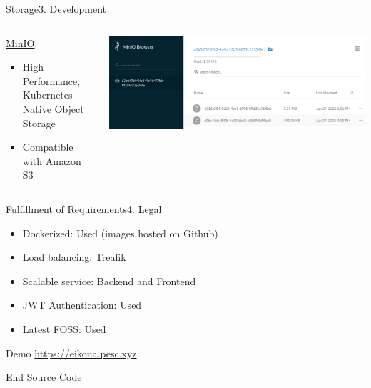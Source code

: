 \documentclass[aspectratio=169,20pt]{beamer}
\begin{document}
\begin{frame}{Storage}{3. Development}
	\begin{columns}[onlytextwidth,T]
		\begin{column}{.40\linewidth}
			\underline{MinIO}:
			\vspace{1in}
			\begin{itemize}
				\item{High Performance, Kubernetes Native Object Storage}
				\item{Compatible with Amazon S3}
			\end{itemize}
		\end{column}
		\begin{column}{.60\linewidth}
			\includegraphics[scale=0.45]{minio}
		\end{column}
	\end{columns}
\end{frame}

\begin{frame}{Fulfillment of Requirements}{4. Legal}
	\begin{itemize}
		\item{Dockerized: \textcolor{deepgreen}{Used (images hosted on Github)}}
		\item{Load balancing: \textcolor{deepgreen}{Treafik}}
		\item{Scalable service: \textcolor{deepgreen}{Backend and Frontend}}
		\item{JWT Authentication: \textcolor{deepgreen}{Used}}
		\item{Latest FOSS: \textcolor{deepgreen}{Used}}
	\end{itemize}
\end{frame}

\begin{frame}{Demo}{}
	\href{https://eikona.pesc.xyz/}{https://eikona.pesc.xyz}
\end{frame}

\begin{frame}{End}{}
	\href{https://github.com/eikona-org/eikona}{Source Code}
\end{frame}
\end{document}
